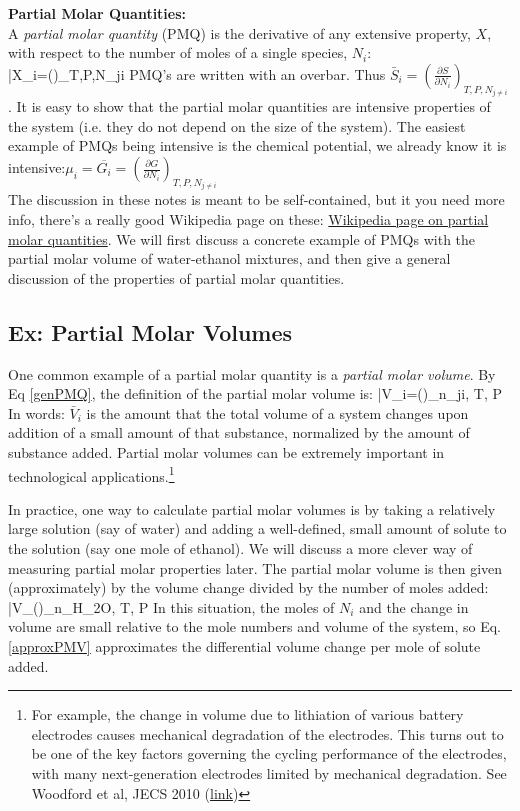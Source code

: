 \documentclass[12pt]{article}
\begin{document}
\textbf{Partial Molar Quantities:}\\
A \emph{partial molar quantity} (PMQ) is the derivative of any extensive property, $X$, with respect to the number of moles of a single species, $N_i$:\\
\eqs \bar{X}_i=\left(\right)_{T,P,N_{j\neq i}} \label{genPMQ}\eqe
PMQ's are written with an overbar. Thus $\bar{S}_i=\left(\frac{\partial S}{\partial N_i}\right)_{T,P,N_{j\neq i}}$. It is easy to show that the partial molar quantities are intensive properties of the system (i.e. they do not depend on the size of the system). The easiest example of PMQs being intensive is the chemical potential, we already know it is intensive:$\mu _i=\overline{G_i}=\left(\frac{\partial G}{\partial N_i}\right)_{T,P,N_{j\neq i}}$\\
The discussion in these notes is meant to be self-contained, but it you need more info, there's a really good Wikipedia page on these: \href{https://en.wikipedia.org/wiki/Partial_molar_property}{Wikipedia page on partial molar quantities}. We will first discuss a concrete example of PMQs with the partial molar volume of water-ethanol mixtures, and then give a general discussion of the properties of partial molar quantities.\\

\subsection{Ex: Partial Molar Volumes}
One common example of a partial molar quantity is a \emph{partial molar volume}. By Eq \ref{genPMQ}, the definition of the partial molar volume is: 
\eqs\bar{V}_i=\left(\right)_{n_{j\neq i}, T, P}\eqe
In words: $\bar{V}_i$ is the amount that the total volume of a system changes upon addition of a small amount of that substance, normalized by the amount of substance added. Partial molar volumes can be extremely important in technological applications.\footnote{For example, the change in volume due to lithiation of various battery electrodes causes mechanical degradation of the electrodes. This turns out to be one of the key factors governing the cycling performance of the electrodes, with many next-generation electrodes limited by mechanical degradation. See Woodford et al, JECS 2010 (\href{http://jes.ecsdl.org/content/157/10/A1052.short}{link})} \par
In practice, one way to calculate partial molar volumes is by taking a relatively large solution (say of water) and adding a well-defined, small amount of solute to the solution (say one mole of ethanol). We will discuss a more clever way of measuring partial molar properties later. The partial molar volume is then given (approximately) by the volume change divided by the number of moles added:
\eqs\bar{V}_{}\simeq \left(\right)_{n_{H_2O}, T, P}
\label{approxPMV}
\eqe
In this situation, the moles of $N_i$ and the change in volume are small relative to the mole numbers and volume of the system, so Eq. \ref{approxPMV} approximates the differential volume change per mole of solute added.
\end{document}
